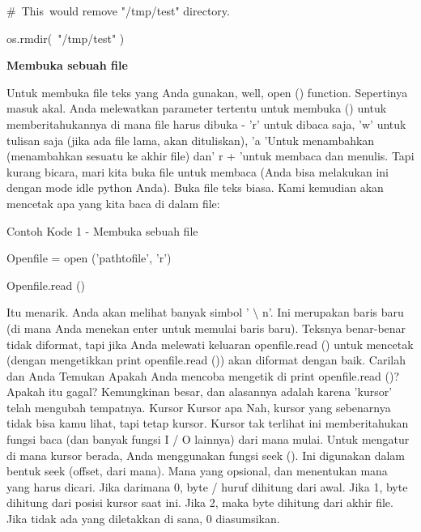 \vspace{12pt}
\noindent 
$  \#  $~This~would  remove "/tmp/test"  directory. \par
\noindent 
os.rmdir(~"/tmp/test"  ) \par
\vspace{12pt}
\vspace{12pt}
\noindent 
{\fontsize{14pt}{14pt}\selectfont \textbf{Membuka sebuah file} \\} \par
\vspace{12pt}
Untuk membuka file teks yang Anda gunakan, well, open () function. Sepertinya masuk akal. Anda melewatkan parameter tertentu untuk membuka () untuk memberitahukannya di mana file harus dibuka - 'r' untuk dibaca saja, 'w' untuk tulisan saja (jika ada file lama, akan dituliskan), 'a 'Untuk menambahkan (menambahkan sesuatu ke akhir file) dan' r + 'untuk membaca dan menulis. Tapi kurang bicara, mari kita buka file untuk membaca (Anda bisa melakukan ini dengan mode idle python Anda). Buka file teks biasa. Kami kemudian akan mencetak apa yang kita baca di dalam file: \par
\noindent 
Contoh Kode 1 - Membuka sebuah file \par
\vspace{12pt}
\noindent 
Openfile = open ('pathtofile', 'r') \par
\noindent 
Openfile.read () \par
\vspace{12pt}
Itu menarik. Anda akan melihat banyak simbol ' $  \setminus  $ n'. Ini merupakan baris baru (di mana Anda menekan enter untuk memulai baris baru). Teksnya benar-benar tidak diformat, tapi jika Anda melewati keluaran openfile.read () untuk mencetak (dengan mengetikkan print openfile.read ()) akan diformat dengan baik. Carilah dan Anda Temukan Apakah Anda mencoba mengetik di print openfile.read ()? Apakah itu gagal? Kemungkinan besar, dan alasannya adalah karena 'kursor' telah mengubah tempatnya. Kursor Kursor apa Nah, kursor yang sebenarnya tidak bisa kamu lihat, tapi tetap kursor. Kursor tak terlihat ini memberitahukan fungsi baca (dan banyak fungsi I / O lainnya) dari mana mulai. Untuk mengatur di mana kursor berada, Anda menggunakan fungsi seek (). Ini digunakan dalam bentuk seek (offset, dari mana). Mana yang opsional, dan menentukan mana yang harus dicari. Jika darimana 0, byte / huruf dihitung dari awal. Jika 1, byte dihitung dari posisi kursor saat ini. Jika 2, maka byte dihitung dari akhir file. Jika tidak ada yang diletakkan di sana, 0 diasumsikan. \par
